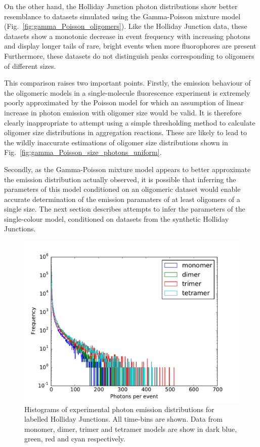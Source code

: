 On the other hand, the Holliday Junction photon distributions show better resemblance to datasets simulated using the Gamma-Poisson mixture model (Fig.~\ref{fig:gamma_Poisson_oligomers}). Like the Holliday Junction data, these datasets show a monotonic decrease in event frequency with increasing photons and display longer tails of rare, bright events when more fluorophores are present Furthermore, these datasets do not distinguish peaks corresponding to oligomers of different sizes. 

This comparison raises two important points. Firstly, the emission behaviour of the oligomeric models in a single-molecule fluorescence experiment is extremely poorly approximated by the Poisson model for which an assumption of linear increase in photon emission with oligomer size would be valid. It is therefore clearly inappropriate to attempt using a simple thresholding method to calculate oligomer size distributions in aggregation reactions. These are likely to lead to the wildly inaccurate estimations of oligomer size distributions shown in Fig.~\ref{fig:gamma_Poisson_size_photons_uniform}.

Secondly, as the Gamma-Poisson mixture model appears to better approximate the emission distribution actually observed, it is possible that inferring the parameters of this model conditioned on an oligomeric dataset would enable accurate determination of the emission paramaters of at least oligomers of a single size. The next section describes attempts to infer the parameters of the single-colour model, conditioned on datasets from the synthetic Holliday Junctions.  

\begin{figure}
   \begin{center}
      \includegraphics*[clip=true, width=6in]{sizing/Holliday_Junctions.pdf}
      \caption{Histograms of experimental photon emission distributions for labelled Holliday Junctions. All time-bins are shown. Data from monomer, dimer, trimer and tetramer models are show in dark blue, green, red and cyan respectively.}
      \label{fig:HJ_oligomers}
   \end{center}
\end{figure}

